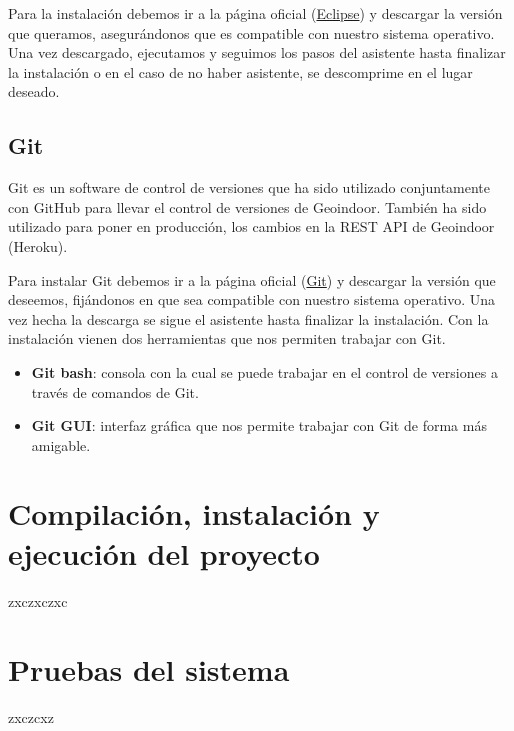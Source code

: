  Para la instalación debemos ir a la página oficial (\href{https://www.eclipse.org/downloads/}{Eclipse}) y descargar la versión que queramos, asegurándonos que es compatible con nuestro sistema operativo. Una vez descargado, ejecutamos y seguimos los pasos del asistente hasta finalizar la instalación o en el caso de no haber asistente, se descomprime en el lugar deseado.
 
 
\subsection{Git} 

Git es un software de control de versiones que ha sido utilizado conjuntamente con GitHub para llevar el control de versiones de Geoindoor. También ha sido utilizado para poner en producción, los cambios en la REST API de Geoindoor (Heroku).

Para instalar Git debemos ir a la página oficial (\href{https://git-scm.com/downloads}{Git}) y descargar la versión que deseemos, fijándonos en que sea compatible con nuestro sistema operativo. Una vez hecha la descarga se sigue el asistente hasta finalizar la instalación. Con la instalación vienen dos herramientas que nos permiten trabajar con Git.

\begin{itemize}
	\item \textbf{Git bash}: consola con la cual se puede trabajar en el control de versiones a través de comandos de Git.
	\item \textbf{Git GUI}: interfaz gráfica que nos permite trabajar con Git de forma más amigable. 
\end{itemize}

\section{Compilación, instalación y ejecución del proyecto}
zxczxczxc

\section{Pruebas del sistema}
zxczcxz